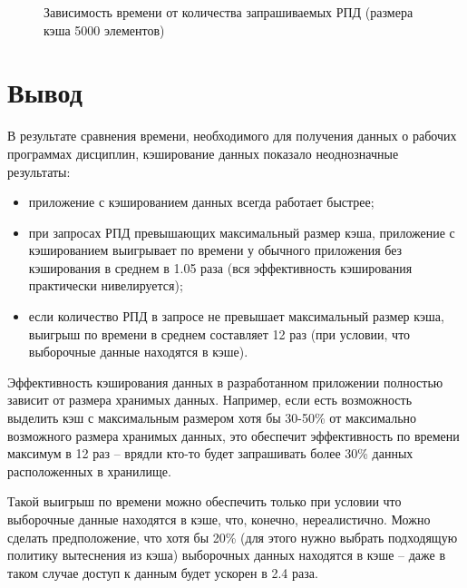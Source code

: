 \begin{figure}[H]
	\centering
	\captionsetup{justification=centering}
	\caption{Зависимость времени от количества запрашиваемых РПД (размера кэша 5000 элементов)}
	\label{plt:experiment3}
\end{figure}

\section*{Вывод}

В результате сравнения времени, необходимого для получения данных о рабочих программах дисциплин, кэширование данных показало неоднозначные результаты: 

\begin{itemize}
	\item приложение с кэшированием данных всегда работает быстрее;
	\item при запросах РПД превышающих максимальный размер кэша, приложение с кэшированием выигрывает по времени у обычного приложения без кэширования в среднем в 1.05 раза (вся эффективность кэширования практически нивелируется);
	\item если количество РПД в запросе не превышает максимальный размер кэша, выигрыш по времени в среднем составляет 12 раз (при условии, что выборочные данные находятся в кэше).
\end{itemize}

Эффективность кэширования данных в разработанном приложении полностью зависит от размера хранимых данных. Например, если есть возможность выделить кэш с максимальным размером хотя бы 30-50\% от максимально возможного размера хранимых данных, это обеспечит эффективность по времени максимум в 12 раз -- врядли кто-то будет запрашивать более 30\% данных расположенных в хранилище. 

Такой выигрыш по времени можно обеспечить только при условии что выборочные данные находятся в кэше, что, конечно, нереалистично. Можно сделать предположение, что хотя бы 20\% (для этого нужно выбрать подходящую политику вытеснения из кэша) выборочных данных находятся в кэше -- даже в таком случае доступ к данным будет ускорен в 2.4 раза.
